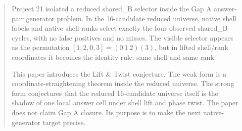 \begin{abstract}
Project 21 isolated a reduced shared\_B selector inside the Gap A answer-pair generator problem.  In the 16-candidate reduced universe, native shell labels and native shell ranks select exactly the four observed shared\_B cycles, with no false positives and no misses.  The visible selector appears as the permutation \([1,2,0,3]=(0\ 1\ 2)(3)\), but in lifted shell/rank coordinates it becomes the identity rule: same shell and same rank.

This paper introduces the Lift \& Twist conjecture.  The weak form is a coordinate-straightening theorem inside the reduced universe.  The strong form conjectures that the reduced 16-candidate universe itself is the shadow of one local answer cell under shell lift and phase twist.  The paper does not claim Gap A closure.  Its purpose is to make the next native-generator target precise.
\end{abstract}
